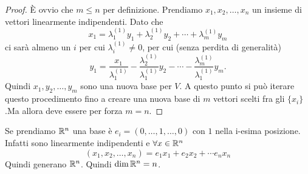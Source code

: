 \begin{proof}
È ovvio che $m \leq n$ per definizione. Prendiamo $x_1, x_2, \ldots, x_n$ un insieme di vettori linearmente indipendenti. Dato che 
\begin{equation*}
x_1 = \lambda_1^{(1)} y_1 + \lambda_2^{(1)} y_2 + \cdots + \lambda_m^{(1)} y_m
\end{equation*}
ci sarà almeno un $i$ per cui $\lambda_i^{(1)} \neq 0$, per cui (senza perdita di generalità)
\begin{equation*}
y_1 = \frac{x_1}{\lambda_1^{(1)}} - \frac{\lambda_2^{(1)}}{\lambda_1^{(1)}} y_2 - \cdots - \frac{\lambda_m^{(1)}}{\lambda_1^{(1)}} y_m.
\end{equation*} 
Quindi $x_1, y_2, \ldots , y_m$ sono una nuova base per $V$. A questo punto si può iterare questo procedimento fino a creare una nuova base di $m$ vettori scelti fra gli $\{x_i\}$.Ma allora deve essere per forza $m=n$. 
\end{proof}

Se prendiamo $\mathbb R^n$ una base è $e_i = (0, \ldots, 1, \ldots,0)$ con $1$ nella i-esima posizione. Infatti sono linearmente indipendenti e $\forall x \in \mathbb R^n$ 
\begin{equation*}
(x_1, x_2, \ldots, x_n) = e_1 x_1 + e_2 x_2 + \cdots e_n x_n
\end{equation*}
Quindi generano $\mathbb R^n$. Quindi $\dim{\mathbb R^n} = n$.